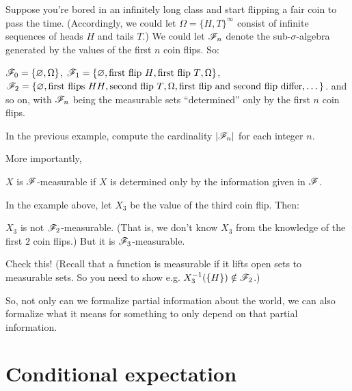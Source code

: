 \begin{example}
	[Filtration]
	Suppose you're bored in an infinitely long class
	and start flipping a fair coin to pass the time.
	(Accordingly, we could let $\Omega = \{H,T\}^\infty$
	consist of infinite sequences of heads $H$ and tails $T$.)
	We could let $\mathscr F_n$ denote the sub-$\sigma$-algebra
	generated by the values of the first $n$ coin flips.
	So:
	\begin{itemize}
		\ii $\mathscr F_0 = \{\varnothing, \Omega\}$,
		\ii $\mathscr F_1 = \{\varnothing, \text{first flip $H$}, \text{first flip $T$}, \Omega\}$,
		\ii $\mathscr F_2 = \{\varnothing, \text{first flips $HH$}, \text{second flip $T$}, \Omega, \text{first flip and second flip differ}, \dots\}$.
		\ii and so on, with $\mathscr F_n$ being the measurable sets
		``determined'' only by the first $n$ coin flips.
	\end{itemize}
\end{example}

\begin{exercise}
	In the previous example, compute the cardinality $|\mathscr F_n|$ for each integer $n$.
\end{exercise}

More importantly,
\begin{moral}
	$X$ is $\mathscr F$-measurable if $X$ is determined only by the information given in $\mathscr F$.
\end{moral}
\begin{example}
	In the example above, let $X_3$ be the value of the third coin flip. Then:
	\begin{itemize}
		\ii $X_3$ is not $\mathscr F_2$-measurable. (That is, we don't know $X_3$ from the knowledge of the
		first $2$ coin flips.)
		\ii But it is $\mathscr F_3$-measurable.
	\end{itemize}
\end{example}
\begin{exercise}
	Check this! (Recall that a function is measurable if it lifts open sets to measurable sets.
	So you need to show e.g. $X_3^{-1}(\{H\}) \notin \mathscr F_2$.)
\end{exercise}
So, not only can we formalize partial information about the world, we can also formalize what it
means for something to only depend on that partial information.

\section{Conditional expectation}

